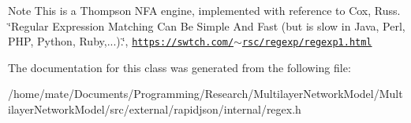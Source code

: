 \begin{DoxyNote}{Note}
This is a Thompson N\+FA engine, implemented with reference to Cox, Russ. \char`\"{}\+Regular Expression Matching Can Be Simple And Fast (but is slow in Java, Perl, P\+H\+P, Python, Ruby,...).\char`\"{}, \href{https://swtch.com/~rsc/regexp/regexp1.html}{\tt https\+://swtch.\+com/$\sim$rsc/regexp/regexp1.\+html} 
\end{DoxyNote}


The documentation for this class was generated from the following file\+:\begin{DoxyCompactItemize}
\item 
/home/mate/\+Documents/\+Programming/\+Research/\+Multilayer\+Network\+Model/\+Multilayer\+Network\+Model/src/external/rapidjson/internal/regex.\+h\end{DoxyCompactItemize}
